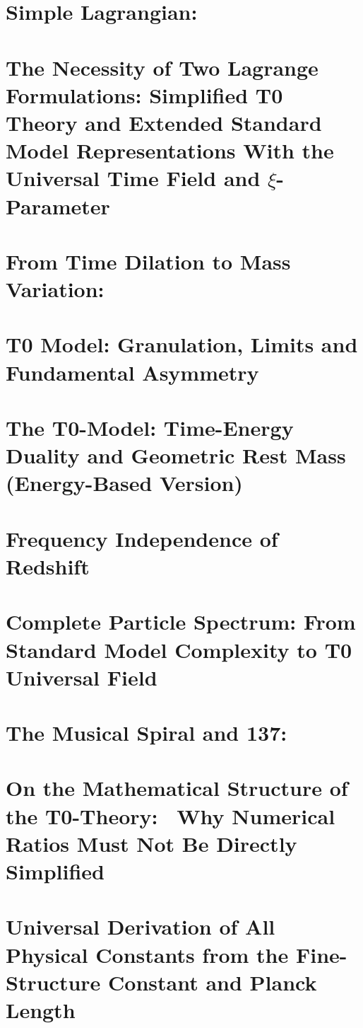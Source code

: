 	
	\chapter{Simple Lagrangian:}
	
	\chapter{The Necessity of Two Lagrange Formulations: Simplified T0 Theory and Extended Standard Model Representations With the Universal Time Field and $\xi$-Parameter}
	
	\chapter{From Time Dilation to Mass Variation:}
	
	\chapter{T0 Model: Granulation, Limits and Fundamental Asymmetry}
	
	\chapter{The T0-Model: Time-Energy Duality and Geometric Rest Mass (Energy-Based Version)}
	
	\chapter{Frequency Independence of Redshift}
	
	\chapter{Complete Particle Spectrum: From Standard Model Complexity to T0 Universal Field}
	
	\chapter{The Musical Spiral and 137:}
	
	\chapter{On the Mathematical Structure of the T0-Theory: \ Why Numerical Ratios Must Not Be Directly Simplified}
	
	\chapter{Universal Derivation of All Physical Constants from the Fine-Structure Constant and Planck Length}
	
